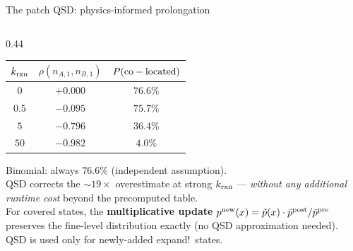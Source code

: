 \documentclass[10pt,aspectratio=169]{beamer}
\begin{document}
\begin{frame}{The patch QSD: physics-informed prolongation}
\begin{columns}[T]
\begin{column}{0.44\textwidth}
      \medskip
      \begin{center}
      \renewcommand{\arraystretch}{1.35}
      \begin{tabular}{@{}ccc@{}}
        \toprule
        $k_{\rm rxn}$ & $\rho(n_{A,1},n_{B,1})$ & $P({\rm co-located})$ \\
        \midrule
        $0$   & $+0.000$ & $76.6\%$ \\
        \rowcolor{myblue!10}
        $0.5$ & $-0.095$ & $75.7\%$ \\
        $5$   & $-0.796$ & $36.4\%$ \\
        \rowcolor{slowred!10}
        $50$  & $-0.982$ & $\mathbf{4.0\%}$ \\
        \bottomrule
      \end{tabular}
      \end{center}

      \medskip
      {\footnotesize
        Binomial: always $76.6\%$ (independent assumption).\\[0.4em]
        QSD corrects the ${\sim}19\times$ overestimate at strong $k_{\rm rxn}$
        --- \emph{without any additional runtime cost}
        beyond the precomputed table.\\[0.4em]
        For covered states, the \textbf{multiplicative update}
        $p^{\rm new}(x) = \tilde p(x)\cdot\bar p^{\rm post}/\bar p^{\rm pre}$
        preserves the fine-level distribution exactly (no QSD approximation needed).
        QSD is used only for newly-added expand!\ states.
      }
    \end{column}
  \end{columns}

\end{frame}
\end{document}
